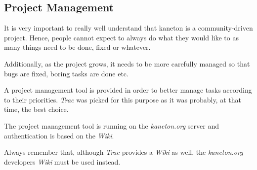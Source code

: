 %
%
%
%
%
%

%
%

\subsection{Project Management}
\label{section:project management}

It is very important to really well understand that kaneton is a
community-driven project. Hence, people cannot expect to always do what
they would like to as many things need to be done, fixed or whatever.

Additionally, as the project grows, it needs to be more carefully managed
so that bugs are fixed, boring tasks are done etc.

A project management tool is provided in order to better manage tasks
according to their priorities. \textit{Trac} was picked for this purpose
as it was probably, at that time, the best choice.

The project management tool is running on the \textit{kaneton.org} server
and authentication is based on the \textit{Wiki}.

Always remember that, although \textit{Trac} provides a \textit{Wiki} as well,
the \textit{kaneton.org} developers \textit{Wiki} must be used instead.
